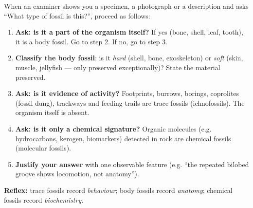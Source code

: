 \documentclass[11pt]{article}
\newcommand{\cle}[1]{{\popxbold\color{popdark}#1}}
\begin{document}
\begin{methode}
When an examiner shows you a specimen, a photograph or a description and asks ``What type of fossil is this?'', proceed as follows:
\begin{enumerate}
\item \textbf{Ask: is it a part of the organism itself?} If yes (bone, shell, leaf, tooth), it is a \cle{body fossil}. Go to step 2. If no, go to step 3.
\item \textbf{Classify the body fossil}: is it \emph{hard} (shell, bone, exoskeleton) or \emph{soft} (skin, muscle, jellyfish — only preserved exceptionally)? State the material preserved.
\item \textbf{Ask: is it evidence of activity?} Footprints, burrows, borings, coprolites (fossil dung), trackways and feeding trails are \cle{trace fossils} (ichnofossils). The organism itself is absent.
\item \textbf{Ask: is it only a chemical signature?} Organic molecules (e.g. hydrocarbons, kerogen, biomarkers) detected in rock are \cle{chemical fossils} (molecular fossils).
\item \textbf{Justify your answer} with one observable feature (e.g. ``the repeated bilobed groove shows locomotion, not anatomy'').
\end{enumerate}
\textbf{Reflex:} trace fossils record \emph{behaviour}; body fossils record \emph{anatomy}; chemical fossils record \emph{biochemistry}.
\end{methode}
\end{document}
